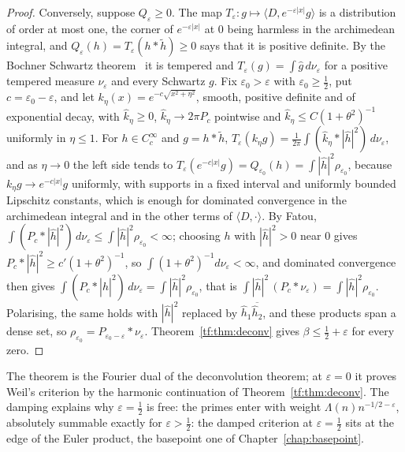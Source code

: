 \begin{proof}
Conversely, suppose $Q_\varepsilon\ge0$. The map $T_\varepsilon:g\mapsto\langle D,e^{-\varepsilon|x|}g\rangle$ is a distribution of order at most one, the corner of $e^{-\varepsilon|x|}$ at $0$ being harmless in the archimedean integral, and $Q_\varepsilon(h)=T_\varepsilon(h*\tilde h)\ge0$ says that it is positive definite. By the Bochner Schwartz theorem~\cite[Chapter II]{GelfandVilenkin4} it is tempered and $T_\varepsilon(g)=\int\hat g\,d\nu_\varepsilon$ for a positive tempered measure $\nu_\varepsilon$ and every Schwartz $g$. Fix $\varepsilon_0>\varepsilon$ with $\varepsilon_0\ge\frac12$, put $c=\varepsilon_0-\varepsilon$, and let $k_\eta(x)=e^{-c\sqrt{x^2+\eta^2}}$, smooth, positive definite and of exponential decay, with $\hat k_\eta\ge0$, $\hat k_\eta\to2\pi P_c$ pointwise and $\hat k_\eta\le C(1+\theta^2)^{-1}$ uniformly in $\eta\le1$. For $h\in C_c^\infty$ and $g=h*\tilde h$, $T_\varepsilon(k_\eta g)=\frac1{2\pi}\int(\hat k_\eta*|\hat h|^2)\,d\nu_\varepsilon$, and as $\eta\to0$ the left side tends to $T_\varepsilon(e^{-c|x|}g)=Q_{\varepsilon_0}(h)=\int|\hat h|^2\rho_{\varepsilon_0}$, because $k_\eta g\to e^{-c|x|}g$ uniformly, with supports in a fixed interval and uniformly bounded Lipschitz constants, which is enough for dominated convergence in the archimedean integral and in the other terms of $\langle D,\cdot\rangle$. By Fatou, $\int(P_c*|\hat h|^2)\,d\nu_\varepsilon\le\int|\hat h|^2\rho_{\varepsilon_0}<\infty$; choosing $h$ with $|\hat h|^2>0$ near $0$ gives $P_c*|\hat h|^2\ge c'(1+\theta^2)^{-1}$, so $\int(1+\theta^2)^{-1}d\nu_\varepsilon<\infty$, and dominated convergence then gives $\int(P_c*|\hat h|^2)\,d\nu_\varepsilon=\int|\hat h|^2\rho_{\varepsilon_0}$, that is $\int|\hat h|^2\,(P_c*\nu_\varepsilon)=\int|\hat h|^2\rho_{\varepsilon_0}$. Polarising, the same holds with $|\hat h|^2$ replaced by $\hat h_1\overline{\hat h_2}$, and these products span a dense set, so $\rho_{\varepsilon_0}=P_{\varepsilon_0-\varepsilon}*\nu_\varepsilon$. Theorem~\ref{tf:thm:deconv} gives $\beta\le\frac12+\varepsilon$ for every zero.
\end{proof}

The theorem is the Fourier dual of the deconvolution theorem; at $\varepsilon=0$ it proves Weil's criterion by the harmonic continuation of Theorem~\ref{tf:thm:deconv}. The damping explains why $\varepsilon=\frac12$ is free: the primes enter with weight $\Lambda(n)n^{-1/2-\varepsilon}$, absolutely summable exactly for $\varepsilon>\frac12$: the damped criterion at $\varepsilon=\frac12$ sits at the edge of the Euler product, the basepoint one of Chapter~\ref{chap:basepoint}.

